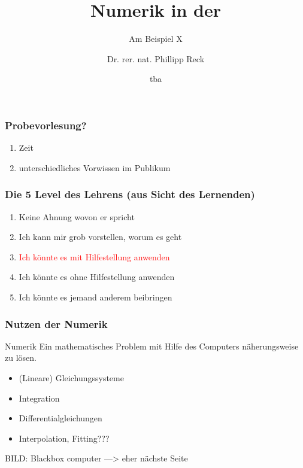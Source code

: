 \documentclass{beamer}
\begin{document}
\title{Numerik in der }
\subtitle{Am Beispiel X}
\author[Phillipp Reck]{Dr. rer. nat. Phillipp Reck}
\date{tba} 

\begin{frame}
\titlepage
\end{frame}



\begin{frame}\frametitle{Probevorlesung?}
    \pause
  \begin{enumerate}
    \item Zeit
    \item unterschiedliches Vorwissen im Publikum
  \end{enumerate}
  \end{frame} 

\begin{frame}
  \titlepage
  \end{frame}
  


\begin{frame}\frametitle{Die 5 Level des Lehrens (aus Sicht des Lernenden)}
    \pause
\begin{enumerate}
  \item  \glqq Keine Ahnung wovon er spricht\grqq\pause
  \item  \glqq Ich kann mir grob vorstellen, worum es geht\grqq\pause
  \item  \textcolor<7>{red}{\glqq Ich könnte es mit Hilfestellung anwenden\grqq}\pause
  \item  \glqq Ich könnte es ohne Hilfestellung anwenden\grqq\pause
  \item  \glqq Ich könnte es jemand anderem beibringen\grqq\pause
\end{enumerate}
\end{frame} 


\begin{frame}\frametitle{Nutzen der Numerik}
    \begin{block}{Numerik}
      Ein mathematisches Problem mit Hilfe des Computers näherungsweise zu lösen.
    \end{block}
    \pause
      \begin{itemize}
        \item (Lineare) Gleichungssysteme
        \item Integration
        \item Differentialgleichungen
        \item Interpolation, Fitting???
      \end{itemize}
    \pause

    BILD: Blackbox computer ---> eher nächste Seite
\end{frame} 
\end{document}
